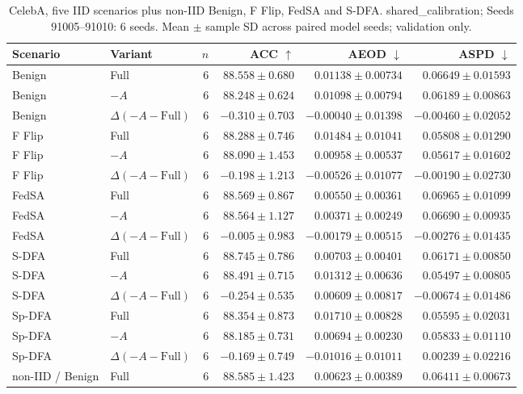 \begin{table}[t]
\centering
\small
\caption{CelebA, five IID scenarios plus non-IID Benign, F Flip, FedSA and S-DFA. shared\_calibration; Seeds 91005–91010: 6 seeds. Mean $\pm$ sample SD across paired model seeds; validation only.}
\begin{tabular}{llrrrr}
\toprule
Scenario & Variant & $n$ & ACC $\uparrow$ & AEOD $\downarrow$ & ASPD $\downarrow$ \\
\midrule
Benign & Full & 6 & $88.558 \pm 0.680$ & $0.01138 \pm 0.00734$ & $0.06649 \pm 0.01593$ \\
Benign & $-A$ & 6 & $88.248 \pm 0.624$ & $0.01098 \pm 0.00794$ & $0.06189 \pm 0.00863$ \\
Benign & $\Delta(-A-\mathrm{Full})$ & 6 & $-0.310 \pm 0.703$ & $-0.00040 \pm 0.01398$ & $-0.00460 \pm 0.02052$ \\
F Flip & Full & 6 & $88.288 \pm 0.746$ & $0.01484 \pm 0.01041$ & $0.05808 \pm 0.01290$ \\
F Flip & $-A$ & 6 & $88.090 \pm 1.453$ & $0.00958 \pm 0.00537$ & $0.05617 \pm 0.01602$ \\
F Flip & $\Delta(-A-\mathrm{Full})$ & 6 & $-0.198 \pm 1.213$ & $-0.00526 \pm 0.01077$ & $-0.00190 \pm 0.02730$ \\
FedSA & Full & 6 & $88.569 \pm 0.867$ & $0.00550 \pm 0.00361$ & $0.06965 \pm 0.01099$ \\
FedSA & $-A$ & 6 & $88.564 \pm 1.127$ & $0.00371 \pm 0.00249$ & $0.06690 \pm 0.00935$ \\
FedSA & $\Delta(-A-\mathrm{Full})$ & 6 & $-0.005 \pm 0.983$ & $-0.00179 \pm 0.00515$ & $-0.00276 \pm 0.01435$ \\
S-DFA & Full & 6 & $88.745 \pm 0.786$ & $0.00703 \pm 0.00401$ & $0.06171 \pm 0.00850$ \\
S-DFA & $-A$ & 6 & $88.491 \pm 0.715$ & $0.01312 \pm 0.00636$ & $0.05497 \pm 0.00805$ \\
S-DFA & $\Delta(-A-\mathrm{Full})$ & 6 & $-0.254 \pm 0.535$ & $0.00609 \pm 0.00817$ & $-0.00674 \pm 0.01486$ \\
Sp-DFA & Full & 6 & $88.354 \pm 0.873$ & $0.01710 \pm 0.00828$ & $0.05595 \pm 0.02031$ \\
Sp-DFA & $-A$ & 6 & $88.185 \pm 0.731$ & $0.00694 \pm 0.00230$ & $0.05833 \pm 0.01110$ \\
Sp-DFA & $\Delta(-A-\mathrm{Full})$ & 6 & $-0.169 \pm 0.749$ & $-0.01016 \pm 0.01011$ & $0.00239 \pm 0.02216$ \\
non-IID / Benign & Full & 6 & $88.585 \pm 1.423$ & $0.00623 \pm 0.00389$ & $0.06411 \pm 0.00673$ \\

\end{tabular}
\end{table}
